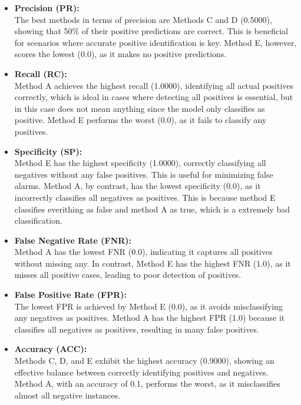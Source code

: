 \documentclass{article}
\begin{document}
\begin{itemize}
	\item \textbf{Precision (PR):} \\
	The best methods in terms of precision are Methods C and D (0.5000), showing that 50\% of their positive predictions are correct. This is beneficial for scenarios where accurate positive identification is key. Method E, however, scores the lowest (0.0), as it makes no positive predictions.
	
	\item \textbf{Recall (RC):} \\
	Method A achieves the highest recall (1.0000), identifying all actual positives correctly, which is ideal in cases where detecting all positives is essential, but in this case does not mean anything since the model only classifies as positive. Method E performs the worst (0.0), as it fails to classify any positives. 
	
	\item \textbf{Specificity (SP):} \\
	Method E has the highest specificity (1.0000), correctly classifying all negatives without any false positives. This is useful for minimizing false alarms. Method A, by contrast, has the lowest specificity (0.0), as it incorrectly classifies all negatives as positives. This is because method E classifies everithing as false and method A as true, which is a extremely bad classification.
	
	\item \textbf{False Negative Rate (FNR):} \\
	Method A has the lowest FNR (0.0), indicating it captures all positives without missing any. In contrast, Method E has the highest FNR (1.0), as it misses all positive cases, leading to poor detection of positives.
	
	\item \textbf{False Positive Rate (FPR):} \\
	The lowest FPR is achieved by Method E (0.0), as it avoids misclassifying any negatives as positives. Method A has the highest FPR (1.0) because it classifies all negatives as positives, resulting in many false positives.
	
	\item \textbf{Accuracy (ACC):} \\
	Methods C, D, and E exhibit the highest accuracy (0.9000), showing an effective balance between correctly identifying positives and negatives. Method A, with an accuracy of 0.1, performs the worst, as it misclassifies almost all negative instances.
	

\end{itemize}
\end{document}
